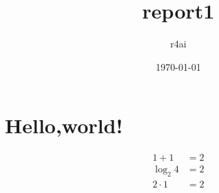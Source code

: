 \documentclass{jsarticle}
\begin{document}
\title{report1}
\author{r4ai}
\date{\today}
\maketitle

\section*{Hello,world!}

\begin{align}
  1 + 1 &= 2 \\
  \log_2{4} &= 2 \\
  2 \cdot 1 &= 2
\end{align}
\end{document}

